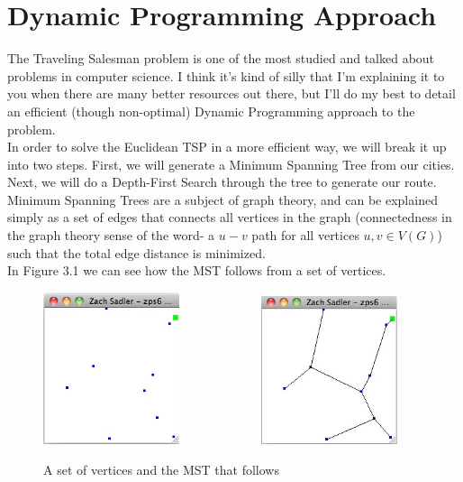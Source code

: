 \documentclass[paper=a4, fontsize=11pt]{scrartcl} %
\numberwithin{equation}{section} %
\numberwithin{figure}{section} %
\numberwithin{table}{section} %
\begin{document}
\section{Dynamic Programming Approach}

The Traveling Salesman problem is one of the most studied and talked about problems in computer science. I think it's kind of silly that I'm explaining it to you when there are many better resources out there, but I'll do my best to detail an efficient (though non-optimal) Dynamic Programming approach to the problem. \\
\indent In order to solve the Euclidean TSP in a more efficient way, we will break it up into two steps. First, we will generate a Minimum Spanning Tree from our cities. Next, we will do a Depth-First Search through the tree to generate our route. \\
\indent Minimum Spanning Trees are a subject of graph theory, and can be explained simply as a set of edges that connects all vertices in the graph (connectedness in the graph theory sense of the word- a $u-v$ path for all vertices $u, v \in V(G)$) such that the total edge distance is minimized. \\
\indent In Figure 3.1 we can see how the MST follows from a set of vertices.

\begin{figure}[ht!]
\centering
\includegraphics[width=40mm]{Figure_4}\,\,\,\,\,\,\,\,\,\,\,\,\,\,\,\,\,\,\,\,\,\,\,\,\,\,\,\,\,\,\,\,\,\,\,\,\,
\includegraphics[width=40mm]{Figure_5}
\caption{A set of vertices and the MST that follows}
\label{overflow}
\end{figure}
\end{document}
